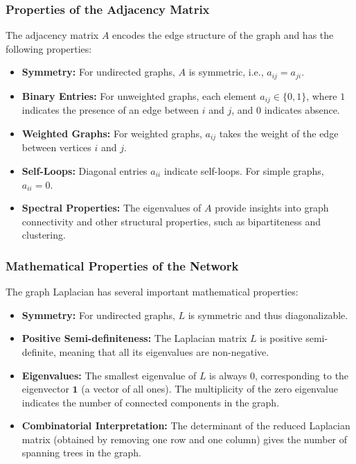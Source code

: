 \documentclass[English, Lau, oneside]{sapthesis}
\begin{document}
\begin{itemize}
\subsubsection{Properties of the Adjacency Matrix}
The adjacency matrix \( A \) encodes the edge structure of the graph and has the following properties:
\begin{itemize}
    \item \textbf{Symmetry:} For undirected graphs, \( A \) is symmetric, i.e., \( a_{ij} = a_{ji} \).
    \item \textbf{Binary Entries:} For unweighted graphs, each element \( a_{ij} \in \{0, 1\} \), where \( 1 \) indicates the presence of an edge between \( i \) and \( j \), and \( 0 \) indicates absence.
    \item \textbf{Weighted Graphs:} For weighted graphs, \( a_{ij} \) takes the weight of the edge between vertices \( i \) and \( j \).
    \item \textbf{Self-Loops:} Diagonal entries \( a_{ii} \) indicate self-loops. For simple graphs, \( a_{ii} = 0 \).
    \item \textbf{Spectral Properties:} The eigenvalues of \( A \) provide insights into graph connectivity and other structural properties, such as bipartiteness and clustering.
\end{itemize}
\subsubsection{Mathematical Properties of the Network}
The graph Laplacian has several important mathematical properties:
\begin{itemize}
    \item \textbf{Symmetry:} For undirected graphs, \( L \) is symmetric and thus diagonalizable.
    \item \textbf{Positive Semi-definiteness:} The Laplacian matrix \( L \) is positive semi-definite, meaning that all its eigenvalues are non-negative.
    \item \textbf{Eigenvalues:} The smallest eigenvalue of \( L \) is always \( 0 \), corresponding to the eigenvector \( \mathbf{1} \) (a vector of all ones). The multiplicity of the zero eigenvalue indicates the number of connected components in the graph.
    \item \textbf{Combinatorial Interpretation:} The determinant of the reduced Laplacian matrix (obtained by removing one row and one column) gives the number of spanning trees in the graph.
\end{itemize}


\end{itemize}
\end{document}
